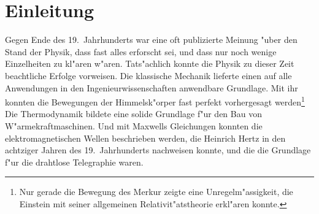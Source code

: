 \chapter{Einleitung\label{chapter:einleitung}}
\rhead{}

Gegen Ende des 19.~Jahrhunderts war eine oft publizierte Meinung 
"uber den Stand der Physik, dass fast alles erforscht sei, und dass
nur noch wenige Einzelheiten zu kl"aren w"aren.
Tats"achlich konnte die Physik zu dieser Zeit beachtliche Erfolge 
vorweisen.
Die klassische Mechanik lieferte einen auf alle Anwendungen in den
Ingenieurwissenschaften anwendbare Grundlage. Mit ihr konnten
die Bewegungen der Himmelsk"orper fast perfekt vorhergesagt werden\footnote{
Nur gerade die Bewegung des Merkur zeigte eine Unregelm"assigkeit, die
Einstein mit seiner allgemeinen Relativit"atstheorie erkl"aren konnte.}
Die Thermodynamik bildete eine solide Grundlage f"ur den Bau von
W"armekraftmaschinen. Und mit Maxwells Gleichungen konnten 
die elektromagnetischen Wellen beschrieben werden, die Heinrich
Hertz in den achtziger Jahren des 19.~Jahrhunderts nachweisen konnte,
und die die Grundlage f"ur die drahtlose Telegraphie waren.

